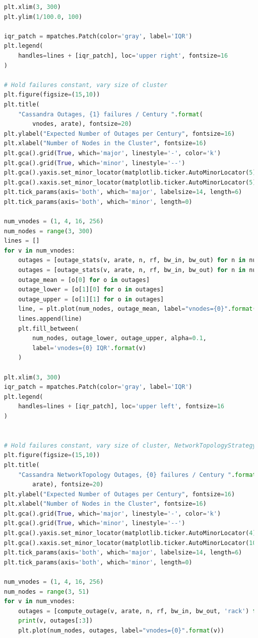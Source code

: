 \documentclass{article}
\begin{document}
\begin{lstlisting}[language=Python]
plt.xlim(3, 300)
plt.ylim(1/100.0, 100)

iqr_patch = mpatches.Patch(color='gray', label='IQR')
plt.legend(
    handles=lines + [iqr_patch], loc='upper right', fontsize=16
)

# Hold failures constant, vary size of cluster
plt.figure(figsize=(15,10))
plt.title(
    "Cassandra Outages, {1} failures / Century ".format(
        vnodes, arate), fontsize=20)
plt.ylabel("Expected Number of Outages per Century", fontsize=16)
plt.xlabel("Number of Nodes in the Cluster", fontsize=16)
plt.gca().grid(True, which='major', linestyle='-', color='k')
plt.gca().grid(True, which='minor', linestyle='--')
plt.gca().yaxis.set_minor_locator(matplotlib.ticker.AutoMinorLocator(5))
plt.gca().xaxis.set_minor_locator(matplotlib.ticker.AutoMinorLocator(5))
plt.tick_params(axis='both', which='major', labelsize=14, length=6)
plt.tick_params(axis='both', which='minor', length=0)

num_vnodes = (1, 4, 16, 256)
num_nodes = range(3, 300)
lines = []
for v in num_vnodes:
    outages = [outage_stats(v, arate, n, rf, bw_in, bw_out) for n in num_nodes]
    outages = [outage_stats(v, arate, n, rf, bw_in, bw_out) for n in num_nodes]
    outage_mean = [o[0] for o in outages]
    outage_lower = [o[1][0] for o in outages]
    outage_upper = [o[1][1] for o in outages]
    line, = plt.plot(num_nodes, outage_mean, label="vnodes={0}".format(v))
    lines.append(line)
    plt.fill_between(
        num_nodes, outage_lower, outage_upper, alpha=0.1,
        label='vnodes={0} IQR'.format(v)
    )

plt.xlim(3, 300)
iqr_patch = mpatches.Patch(color='gray', label='IQR')
plt.legend(
    handles=lines + [iqr_patch], loc='upper left', fontsize=16
)


# Hold failures constant, vary size of cluster, NetworkTopologyStrategy
plt.figure(figsize=(15,10))
plt.title(
    "Cassandra NetworkTopology Outages, {0} failures / Century ".format(
        arate), fontsize=20)
plt.ylabel("Expected Number of Outages per Century", fontsize=16)
plt.xlabel("Number of Nodes in the Cluster", fontsize=16)
plt.gca().grid(True, which='major', linestyle='-', color='k')
plt.gca().grid(True, which='minor', linestyle='--')
plt.gca().yaxis.set_minor_locator(matplotlib.ticker.AutoMinorLocator(4))
plt.gca().xaxis.set_minor_locator(matplotlib.ticker.AutoMinorLocator(10))
plt.tick_params(axis='both', which='major', labelsize=14, length=6)
plt.tick_params(axis='both', which='minor', length=0)

num_vnodes = (1, 4, 16, 256)
num_nodes = range(3, 51)
for v in num_vnodes:
    outages = [compute_outage(v, arate, n, rf, bw_in, bw_out, 'rack') for n in num_nodes]
    print(v, outages[:3])
    plt.plot(num_nodes, outages, label="vnodes={0}".format(v))


\end{lstlisting}
\end{document}

